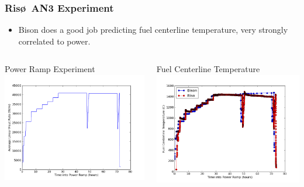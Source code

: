 \begin{frame}
\frametitle{Ris\o~AN3 Experiment}

\begin{itemize}
  \item Bison does a good job predicting fuel centerline temperature, very strongly correlated to power.
\end{itemize}

\begin{columns}
 \begin{column}{0.5\textwidth}
  \centering
  Power Ramp Experiment
  \includegraphics[width=1.\textwidth]{./power_ramp.png}
 \end{column}
 \begin{column}{0.5\textwidth}
  \centering
  Fuel Centerline Temperature
  \includegraphics[width=1.\textwidth]{./tc_temp_comparison.png}
 \end{column}
\end{columns}

\end{frame}
